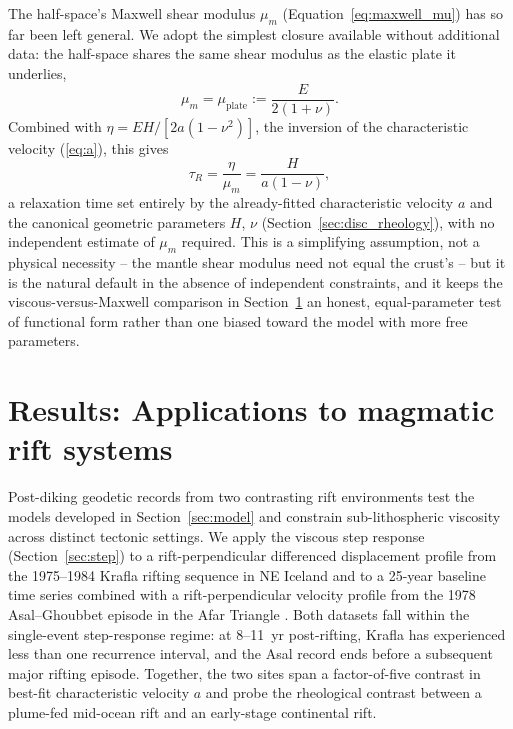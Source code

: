 \documentclass[extra]{gji}
\begin{document}
The half-space's Maxwell shear modulus $\mu_m$ (Equation~\ref{eq:maxwell_mu})
has so far been left general.  We adopt the simplest closure available
without additional data: the half-space shares the same shear modulus as the
elastic plate it underlies,
\begin{equation}
\mu_m = \mu_{\text{plate}} := \frac{E}{2(1+\nu)}.
\label{eq:mu_shared}
\end{equation}
Combined with $\eta = EH/[2a(1-\nu^2)]$, the inversion of the characteristic
velocity (\ref{eq:a}), this gives
\begin{equation}
\boxed{\tau_R = \frac{\eta}{\mu_m} = \frac{H}{a(1-\nu)}},
\label{eq:tau_R_shared}
\end{equation}
a relaxation time set entirely by the already-fitted characteristic velocity
$a$ and the canonical geometric parameters $H$, $\nu$
(Section~\ref{sec:disc_rheology}), with no independent estimate of $\mu_m$
required.  This is a simplifying assumption, not a physical necessity -- the
mantle shear modulus need not equal the crust's -- but it is the natural
default in the absence of independent constraints, and it keeps the
viscous-versus-Maxwell comparison in Section~\ref{sec:results} an honest,
equal-parameter test of functional form rather than one biased toward the
model with more free parameters.

\section{Results: Applications to magmatic rift systems}
\label{sec:results}

Post-diking geodetic records from two contrasting rift environments test the
models developed in Section~\ref{sec:model} and constrain sub-lithospheric
viscosity across distinct tectonic settings.  We apply the viscous step
response (Section~\ref{sec:step}) to a rift-perpendicular differenced
displacement profile from the 1975--1984 Krafla rifting sequence in NE
Iceland \citep{foulger1992post} and to a 25-year baseline time series
combined with a rift-perpendicular velocity profile from the 1978
Asal--Ghoubbet episode in the Afar Triangle \citep{vigny2007twenty}.
Both datasets fall within the single-event step-response regime: at
8--11~yr post-rifting, Krafla has experienced less than one recurrence
interval, and the Asal record ends before a subsequent major rifting
episode.  Together, the two sites span a factor-of-five contrast in
best-fit characteristic velocity $a$ and probe the rheological contrast
between a plume-fed mid-ocean rift and an early-stage continental rift.
\end{document}
